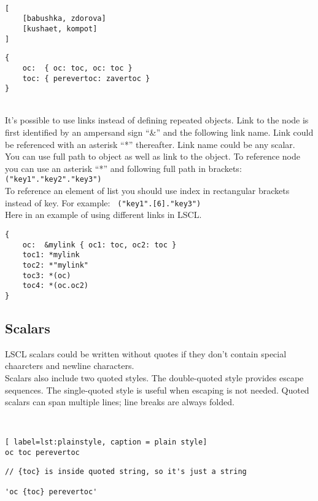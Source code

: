~\\
\begin{minipage}{0.45\textwidth}
\begin{lstlisting}[caption = list of lists]
[
	[babushka, zdorova]
	[kushaet, kompot]
]
\end{lstlisting}
\end{minipage}
\hfill
\begin{minipage}{0.45\textwidth}
\begin{lstlisting}[caption = map of maps]
{
	oc:  { oc: toc, oc: toc }
	toc: { perevertoc: zavertoc }
}
\end{lstlisting}
\end{minipage}
~\\
It's possible to use links instead of defining repeated objects. Link to the node is first identified by an ampersand sign ``\&'' and the following link name. Link could be referenced with an asterisk ``*'' thereafter. Link name could be any scalar. \\
You can use full path to object as well as link to the object. To reference node you can use an asterisk ``*'' and following full path in brackets: \texttt{ \Large*("key1"."key2"."key3")} \\
To reference an element of list you should use index in rectangular brackets instead of key.
For example: \texttt{ \Large*("key1".[6]."key3")} \\
Here in an example of using different links in LSCL.
\begin{lstlisting}[caption = using links]
{
	oc:  &mylink { oc1: toc, oc2: toc }
	toc1: *mylink
	toc2: *"mylink"
	toc3: *(oc)
	toc4: *(oc.oc2)
}
\end{lstlisting}

\subsection{Scalars}
LSCL scalars could be written without quotes if they don't contain special chaarcters and newline characters. \\
Scalars also include two quoted styles. The double-quoted style provides escape sequences. The single-quoted style is useful when escaping is not needed. Quoted scalars can span multiple lines; line breaks are always folded.

~\\
\begin{minipage}{0.45\textwidth}
\begin{lstlisting}[ label=lst:plainstyle, caption = plain style]
oc toc perevertoc
\end{lstlisting}
\end{minipage}
\hfill
\begin{minipage}{0.45\textwidth}
\begin{lstlisting}[caption = single-quoted style]
// {toc} is inside quoted string, so it's just a string

'oc {toc} perevertoc'
\end{lstlisting}
\end{minipage}

